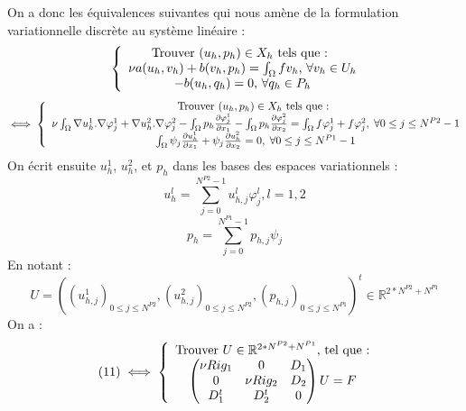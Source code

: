\documentclass[a4paper,12pt]{article}
\begin{document}
On a donc les équivalences suivantes qui nous amène de la formulation variationnelle discrète au système linéaire :
\begin{equation}
\left \{
\begin{array}{c @{} c}
\text{Trouver } (u_{h},p_{h}) \in X_{h} \text{ tels que : } \\
\nu a(u_{h},v_{h}) + b(v_{h},p_{h}) = \int_{\Omega} fv_{h} \text{, } \forall v_{h} \in U_{h} \\
-b(u_{h},q_{h}) = 0 \text{, } \forall q_{h} \in P_{h}\\
\end{array}
\right.
\end{equation}
\begin{equation}
\iff \left \{
\begin{array}{c @{} c}
\text{Trouver } (u_{h},p_{h}) \in X_{h} \text{ tels que : } \\
\nu \int_{\Omega} \nabla u_{h}^{1} . \nabla \varphi_{j}^{1} + \nabla u_{h}^{2} . \nabla \varphi_{j}^{2} - \int_{\Omega} p_{h} \frac{\partial \varphi_{j}^{1}}{\partial x_{1}} - \int_{\Omega} p_{h} \frac{\partial \varphi_{j}^{2}}{\partial x_{2}} = \int_{\Omega} f \varphi_{j}^{1} + f\varphi_{j}^{2}, \; \forall 0 \leq j \leq N^{P2}-1\\
\int_{\Omega} \psi_{j} \frac{\partial u_{h}^{1}}{\partial x_{1}} + \psi_{j} \frac{\partial u_{h}^{2}}{\partial x_{2}} = 0, \; \forall 0 \leq j \leq N^{P1}-1
\end{array}
\right.
\end{equation}
On écrit ensuite $u_{h}^{1}$, $u_{h}^{2}$, et $p_h$ dans les bases des espaces variationnels :
\begin{equation}
u_{h}^{l} = \sum_{j=0}^{N^{P2}-1} u_{h,j}^{l} \varphi_{j}^{l}, l = 1, 2
\end{equation}
\begin{equation}
p_{h} = \sum_{j = 0}^{N^{P1}-1} p_{h,j}\psi_{j}
\end{equation}
En notant :
\begin{equation}
U = \left( \left( u_{h,j}^{1} \right)_{0 \leq j \leq N^{P2}}, \left( u_{h,j}^{2} \right)_{0 \leq j \leq N^{P2}}, \left( p_{h,j} \right)_{0 \leq j \leq N^{P1}} \right)^{t} \in \mathbb{R}^{2*N^{P2}+N^{P1}}
\end{equation}
On a :
\begin{equation}
(11) \iff \left \{
\begin{array}{c @{} c}
\text{Trouver } U \in \mathbb{R}^{2*N^{P2}+N^{P1}} \text{, tel que :} \\
\begin{pmatrix}
\nu Rig_{1} & 0 & D_{1} \\
0 & \nu Rig_{2} & D_{2} \\
D_{1}^{t} & D_{2}^{t} & 0 \\
\end{pmatrix} U = F\\
\end{array}
\right.
\end{equation}
\end{document}
